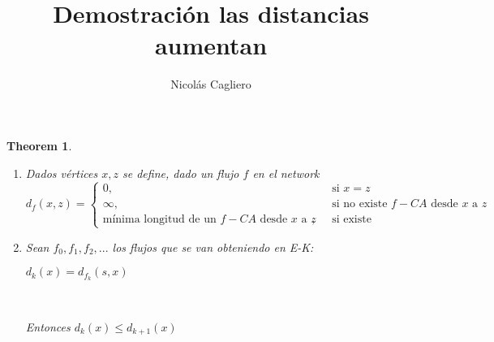 \documentclass[11pt]{article}
\title{Demostración las distancias aumentan}
\author{Nicolás Cagliero}
\newtheorem{theorem}{Theorem}
\begin{document}
\maketitle
\begin{theorem}\par
\

\begin{enumerate}
\item Dados vértices $x, z$ se define, dado un flujo $f$ en el network
\[   
d_f(x,z) = 
     \begin{cases}
       \text{\(0\)}, &\quad\text{si \(x=z\)}\\
       \text{\(\infty\)}, &\quad\text{si no existe \(f-CA\) desde \(x\) a \(z\)}\\
       \text{mínima longitud de un \(f-CA\) desde \(x\) a \(z\)}, &\quad\text{si existe}
     \end{cases}
\]

\item Sean $f_0, f_1, f_2, ...$  los flujos que se van obteniendo en E-K:
\begin{center}
	$d_k(x) = d_{f_k}(s, x)$\par
\end{center}
\

Entonces $d_k(x) \le d_{k+1}(x)$\par
\

\end{enumerate}

\end{theorem}
\end{document}
